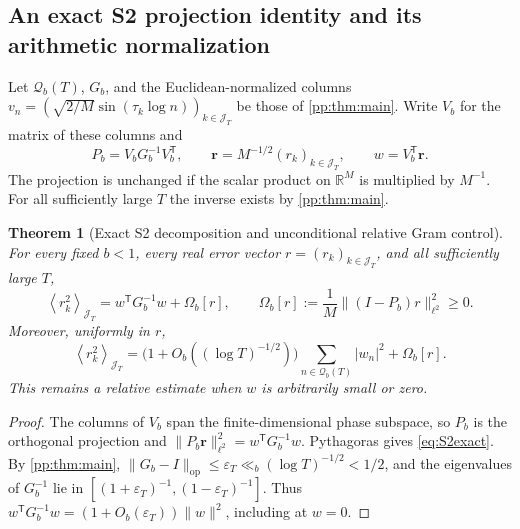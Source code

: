 \documentclass[11pt,reqno]{amsart}
\numberwithin{equation}{section}
\newtheorem{theorem}{Theorem}[section]
\newcommand{\R}{\mathbb R}
\newcommand{\avgJ}[1]{\left\langle #1\right\rangle_{\mathcal J_T}}
\begin{document}
\subsection{An exact S2 projection identity and its arithmetic normalization}
\label{sec:S2projection}
Let $\mathcal Q_b(T)$, $G_b$, and the Euclidean-normalized columns
$v_n=(\sqrt{2/M}\sin(\tau_k\log n))_{k\in\mathcal J_T}$ be those of
\cref{pp:thm:main}. Write $V_b$ for the matrix of these columns and
\begin{equation}\label{eq:S2projection}
P_b=V_bG_b^{-1}V_b^{\mathsf T},\qquad
\mathbf r=M^{-1/2}(r_k)_{k\in\mathcal J_T},\qquad
w=V_b^{\mathsf T}\mathbf r.
\end{equation}
The projection is unchanged if the scalar product on $\R^M$ is multiplied by $M^{-1}$. For all sufficiently large $T$ the inverse exists by \cref{pp:thm:main}.

\begin{theorem}[Exact S2 decomposition and unconditional relative Gram control]\label{thm:S2exact}
For every fixed $b<1$, every real error vector $r=(r_k)_{k\in\mathcal J_T}$, and all sufficiently large $T$,
\begin{equation}\label{eq:S2exact}
\avgJ{r_k^2}=w^{\mathsf T}G_b^{-1}w+\Omega_b[r],\qquad
\Omega_b[r]:=\frac1M\|(I-P_b)r\|_{\ell^2}^2\ge0.
\end{equation}
Moreover, uniformly in $r$,
\begin{equation}\label{eq:S2relative}
\avgJ{r_k^2}
=\bigl(1+O_b((\log T)^{-1/2})\bigr)\sum_{n\in\mathcal Q_b(T)}|w_n|^2
+\Omega_b[r].
\end{equation}
This remains a relative estimate when $w$ is arbitrarily small or zero.
\end{theorem}
\begin{proof}
The columns of $V_b$ span the finite-dimensional phase subspace, so
$P_b$ is the orthogonal projection and
$\|P_b\mathbf r\|_{\ell^2}^2=w^{\mathsf T}G_b^{-1}w$.
Pythagoras gives \eqref{eq:S2exact}. By \cref{pp:thm:main},
$\|G_b-I\|_{\mathrm{op}}\le\varepsilon_T\ll_b(\log T)^{-1/2}<1/2$, and the eigenvalues of $G_b^{-1}$ lie in
$[(1+\varepsilon_T)^{-1},(1-\varepsilon_T)^{-1}]$.
Thus $w^{\mathsf T}G_b^{-1}w=(1+O_b(\varepsilon_T))\|w\|^2$, including at $w=0$.
\end{proof}
\end{document}
